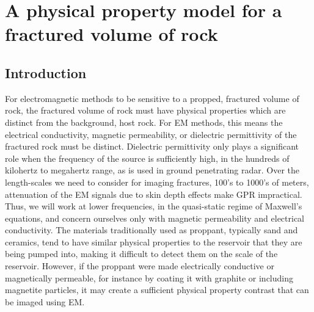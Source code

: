 
\chapter{A physical property model for a fractured volume of rock}
\label{ch:phys-prop-model}

\section{Introduction}
For electromagnetic methods to be sensitive to a propped, fractured volume of rock, the fractured volume of rock must have physical properties which are distinct from the background, host rock. For EM methods, this means the electrical conductivity, magnetic permeability, or dielectric permittivity of the fractured rock must be distinct. Dielectric permittivity only plays a significant role when the frequency of the source is sufficiently high, in the hundreds of kilohertz to megahertz range, as is used in ground penetrating radar. Over the length-scales we need to consider for imaging fractures, 100’s to 1000’s of meters, attenuation of the EM signals due to skin depth effects make GPR impractical. Thus, we will work at lower frequencies, in the quasi-static regime of Maxwell's equations, and concern ourselves only with magnetic permeability and electrical conductivity. The materials traditionally used as proppant, typically sand and ceramics, tend to have similar physical properties to the reservoir that they are being pumped into, making it difficult to detect them on the scale of the reservoir. However, if the proppant were made electrically conductive or magnetically permeable, for instance by coating it with graphite or including magnetite particles, it may create a sufficient physical property contrast that can be imaged using EM.

